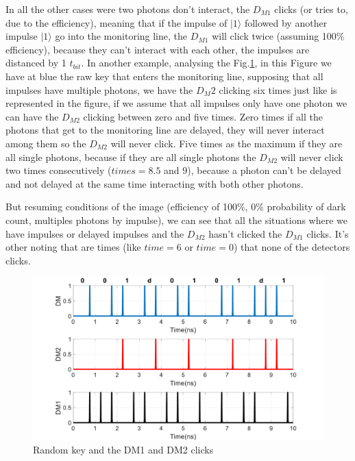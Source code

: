 \begin{refsection}
In all the other cases were two photons don't interact, the $D_{M1}$ clicks (or tries to, due to the efficiency), meaning that if the impulse of $|1\rangle$ followed by another impulse $|1\rangle$ go into the monitoring line, the $D_{M1}$ will click twice (assuming 100\% efficiency), because they can't interact with each other, the impulses are distanced by 1 $t_{bit}$. In another example, analysing the Fig.\ref{fig:dm3}, in this Figure we have at blue the raw key that enters the monitoring line, supposing that all impulses have multiple photons, we have the $D_M2$ clicking six times just like is represented in the figure, if we assume that all impulses only have one photon we can have the $D_{M2}$ clicking between zero and five times. Zero times if all the photons that get to the monitoring line are delayed, they will never interact among them so the $D_{M2}$ will never click. Five times as the maximum if they are all single photons, because if they are all single photons the $D_{M2}$ will never click two times consecutively ($times=8.5$ and $9$), because a photon can't be delayed and not delayed at the same time interacting with both other photons.

But resuming conditions of the image (efficiency of 100\%, 0\% probability of dark count, multiples photons by impulse), we can see that all the situations where we have impulses or delayed impulses and the $D_{M2}$ hasn't clicked the $D_{M1}$ clicks. It's other noting that are times (like $time=6$ or $time=0$) that none of the detectors clicks.

\begin{figure}[hbt!]
\centering
\includegraphics[width=1\textwidth]{./sdf/tq_76558_cow_protocol/slides/figures/DM3.pdf}
\caption{Random key and the DM1 and DM2 clicks}
\label{fig:dm3}
\end{figure}


\end{refsection}
